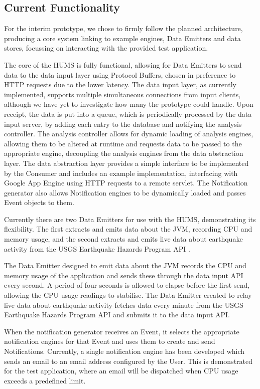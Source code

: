 \documentclass[10pt,a4paper]{article}
\begin{document}
\subsection{Current Functionality}
For the interim prototype, we chose to firmly follow the planned architecture, producing a core system linking to example engines, Data Emitters and data stores, focussing on interacting with the provided test application.

The core of the HUMS is fully functional, allowing for Data Emitters to send data 
to the data input layer using Protocol Buffers, chosen in preference to HTTP 
requests due to the lower latency. The data input layer, as currently 
implemented, supports multiple simultaneous connections from input clients, 
although we have yet to investigate how many the prototype could handle. 
Upon receipt, the data is put into a queue, which is periodically processed by 
the data input server, by adding each entry to the database and notifying the 
analysis controller. The analysis controller allows for dynamic loading of 
analysis engines, allowing them to be altered at runtime and requests data to 
be passed to the appropriate engine, decoupling the analysis engines from the 
data abstraction layer. The data abstraction layer provides a simple interface to 
be implemented by the Consumer and includes an example implementation, 
interfacing with Google App Engine using HTTP requests to a remote servlet. 
The Notification generator also allows Notification engines to be dynamically 
loaded and passes Event objects to them.

Currently there are two Data Emitters for use with the HUMS, demonstrating its 
flexibility. The first extracts and emits data about the JVM, recording CPU and 
memory usage, and the second extracts and emits live data about earthquake 
activity from the USGS Earthquake Hazards Program API \cite{usgs}.

The Data Emitter designed to emit data about the JVM records the CPU and 
memory usage of the application and sends these through the data input API 
every second. A period of four seconds is allowed to elapse before the first 
send, allowing the CPU usage readings to stabilise. The Data Emitter created to 
relay live data about earthquake activity fetches data every minute from the 
USGS Earthquake Hazards Program API and submits it to the data input API.


When the notification generator receives an Event, it selects the appropriate 
notification engines for that Event and uses them to create and send  
Notifications. Currently, a single notification engine has been developed which 
sends an email to an email address configured by the User. This is 
demonstrated for the test application, where an email will be dispatched when 
CPU usage exceeds a predefined limit.
\end{document}
